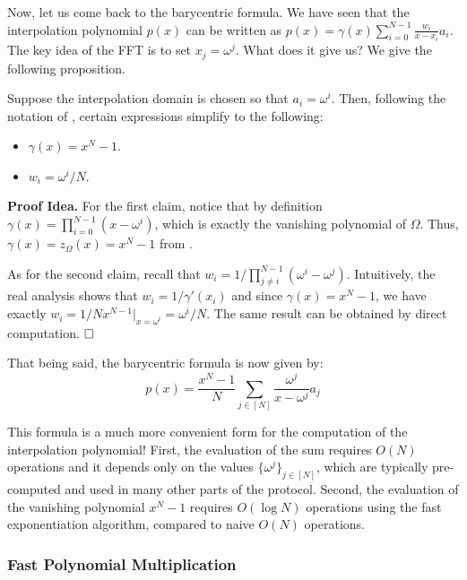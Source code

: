 \documentclass[../../book.tex]{subfiles}
\begin{document}
Now, let us come back to the barycentric formula. We have seen that the
interpolation polynomial $p(x)$ can be written as $p(x) = \gamma(x) 
\sum_{i=0}^{N-1} \frac{w_i}{x-x_i}a_i$. The key idea of the FFT is to
set $x_j = \omega^j$. What does it give us? We give the following proposition.

\begin{proposition}
    Suppose the interpolation domain is chosen so that $a_i = \omega^i$. Then, 
    following the notation of , certain expressions 
    simplify to the following:
    \begin{itemize}
        \item $\gamma(x) = x^N-1$.
        \item $w_i = \omega^i/N$.
    \end{itemize}
\end{proposition}

\textbf{Proof Idea.} For the first claim, notice that
by definition $\gamma(x) = \prod_{i=0}^{N-1}(x-\omega^i)$, which is exactly 
the vanishing polynomial of $\Omega$. Thus, $\gamma(x) = z_{\Omega}(x) = x^N-1$
from . 

As for the second claim, recall that $w_i = 1/\prod_{j \neq
i}^{N-1}(\omega^i-\omega^j)$. Intuitively, the real analysis
shows that $w_i = 1/\gamma'(x_i)$ and since $\gamma(x)=x^N-1$, we 
have exactly $w_i = 1/Nx^{N-1}\Big|_{x=\omega^i}=\omega^i/N$. The same 
result can be obtained by direct computation. $\hfill\Box$

That being said, the barycentric formula is now given by:
\begin{equation*}
    p(x) = \frac{x^N-1}{N} \sum_{j \in [N]} \frac{\omega^j}{x-\omega^j}a_j
\end{equation*}

This formula is a much more convenient form for the computation of the
interpolation polynomial! First, the evaluation of the sum requires $O(N)$
operations and it depends only on the values $\{\omega^j\}_{j \in [N]}$,
which are typically pre-computed and used in many other parts of the protocol.
Second, the evaluation of the vanishing polynomial $x^N-1$ requires $O(\log N)$
operations using the fast exponentiation algorithm, compared to naive 
$O(N)$ operations. 

\subsubsection{Fast Polynomial Multiplication}
\end{document}
